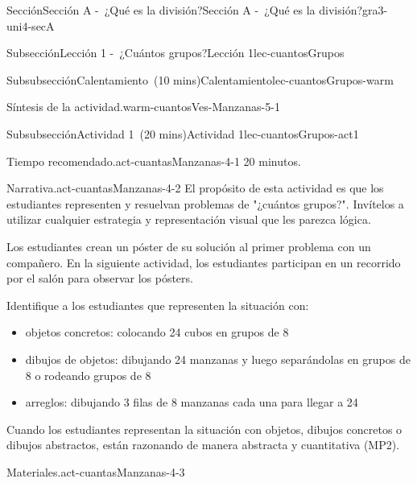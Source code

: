 \documentclass[oneside,10pt,]{article}
\newlength{\fillinmaxwidth}
\newlength{\fillincontract}
\newlength{\charmaxwidth}\setlength{\charmaxwidth}{0.5em}
\newlength{\charminwidth}\setlength{\charminwidth}{0.1em}
\newlength{\fillinheight}
\newcommand{\fillintext}[1]{%
\setlength{\fillinmaxwidth}{#1\charmaxwidth}%
\setlength{\fillincontract}{#1\charminwidth}%
\setlength{\fillinheight}{\baselineskip}\addtolength{\fillinheight}{1.2pt}%
\strut\nobreak\leaders\vbox{\hrule width 0.3pt height 0.3pt \vskip -1.2pt}\hskip 1\fillinmaxwidth minus \fillincontract\nobreak\strut%
}
\begin{document}
\begin{sectionptx}{Sección}{Sección A -~¿Qué es la división?}{}{Sección A -~¿Qué es la división?}{}{}{gra3-uni4-secA}
\begin{subsectionptx}{Subsección}{Lección 1 -~¿Cuántos grupos?}{}{Lección 1}{}{}{lec-cuantosGrupos}
\begin{subsubsectionptx}{Subsubsección}{Calentamiento~(10 mins)}{}{Calentamiento}{}{}{lec-cuantosGrupos-warm}
\begin{paragraphs}{Síntesis de la actividad.}{warm-cuantosVes-Manzanas-5-1}
\begin{itemize}[label=\textbullet]
%
\end{itemize}
\end{paragraphs}%
\end{subsubsectionptx}
%
%
\typeout{************************************************}
\typeout{************************************************}
%
\begin{subsubsectionptx}{Subsubsección}{Actividad 1~(20 mins)}{}{Actividad 1}{}{}{lec-cuantosGrupos-act1}
\par
\begin{paragraphs}{Tiempo recomendado.}{act-cuantasManzanas-4-1}%
20 minutos.%
\end{paragraphs}%
\begin{paragraphs}{Narrativa.}{act-cuantasManzanas-4-2}%
El propósito de esta actividad es que los estudiantes representen y resuelvan problemas de "¿cuántos grupos?". Invítelos a utilizar cualquier estrategia y representación visual que les parezca lógica.%
\par
Los estudiantes crean un póster de su solución al primer problema con un compañero. En la siguiente actividad, los estudiantes participan en un recorrido por el salón para observar los pósters.%
\par
Identifique a los estudiantes que representen la situación con:%
%
\begin{itemize}[label=\textbullet]
\item{}objetos concretos: colocando 24 cubos en grupos de 8%
\item{}dibujos de objetos: dibujando 24 manzanas y luego separándolas en grupos de 8 o rodeando grupos de 8%
\item{}arreglos: dibujando 3 filas de 8 manzanas cada una para llegar a 24%
\end{itemize}
Cuando los estudiantes representan la situación con objetos, dibujos concretos o dibujos abstractos, están razonando de manera abstracta y cuantitativa (MP2).%
\end{paragraphs}%
\begin{paragraphs}{Materiales.}{act-cuantasManzanas-4-3}%

\end{paragraphs}
\end{subsubsectionptx}
\end{subsectionptx}
\end{sectionptx}
\end{document}
